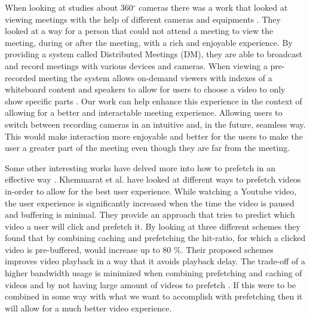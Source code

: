 When looking at studies about 360$^{\circ}$ cameras there was a work that looked at viewing meetings with the help of different cameras and equipments \cite{distributedmeetings}. They looked at a way for a person that could not attend a meeting to view the meeting, during or after the meeting, with a rich and enjoyable experience. By providing a system called Distributed Meetings (DM), they are able to broadcast and record meetings with various devices and cameras. When viewing a pre-recorded meeting the system allows on-demand viewers with indexes of a whiteboard content and speakers to allow for users to choose a video to only show specific parts \cite{distributedmeetings}. Our work can help enhance this experience in the context of allowing for a better and interactable meeting experience. Allowing users to switch between recording cameras in an intuitive and, in the future, seamless way. This would make interaction more enjoyable and better for the users to make the user a greater part of the meeting even though they are far from the meeting.

Some other interesting works have delved more into how to prefetch in an effective way \cite{tvservices, watchingprefetching}. Khemmarat et al. \cite{watchingprefetching} have looked at different ways to prefetch videos in-order to allow for the best user experience. While watching a Youtube video, the user experience is significantly increased when the time the video is paused and buffering is minimal. They provide an approach that tries to predict which video a user will click and prefetch it. By looking at three different schemes they found that by combining caching and prefetching the hit-ratio, for which a clicked video is pre-buffered, would increase up to 80 \%. Their proposed schemes improves video playback in a way that it avoids playback delay. The trade-off of a higher bandwidth usage is minimized when combining prefetching and caching of videos \cite{tvservices, watchingprefetching} and by not having large amount of videos to prefetch \cite{watchingprefetching}. If this were to be combined in some way with what we want to accomplish with prefetching then it will allow for a much better video experience.
